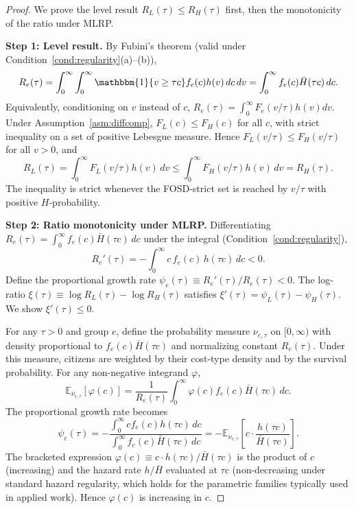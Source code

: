\begin{proof}
We prove the level result $R_L(\tau) \leq R_H(\tau)$ first, then the monotonicity of the ratio under MLRP.

\textbf{Step 1: Level result.} By Fubini's theorem (valid under Condition~\ref{cond:regularity}(a)--(b)),
\[
R_e(\tau) = \int_0^\infty \int_0^\infty \mathbbm{1}\{v \geq \tau c\} f_e(c) h(v) \, dc \, dv = \int_0^\infty f_e(c) \bar H(\tau c) \, dc.
\]
Equivalently, conditioning on $v$ instead of $c$, $R_e(\tau) = \int_0^\infty F_e(v/\tau) h(v) dv$. Under Assumption~\ref{asm:diffcomp}, $F_L(c) \leq F_H(c)$ for all $c$, with strict inequality on a set of positive Lebesgue measure. Hence $F_L(v/\tau) \leq F_H(v/\tau)$ for all $v > 0$, and
\[
R_L(\tau) = \int_0^\infty F_L(v/\tau) h(v) \, dv \leq \int_0^\infty F_H(v/\tau) h(v) \, dv = R_H(\tau).
\]
The inequality is strict whenever the FOSD-strict set is reached by $v/\tau$ with positive $H$-probability.

\textbf{Step 2: Ratio monotonicity under MLRP.} Differentiating $R_e(\tau) = \int_0^\infty f_e(c) \bar H(\tau c) \, dc$ under the integral (Condition~\ref{cond:regularity}),
\begin{equation}
R_e'(\tau) = -\int_0^\infty c \, f_e(c) \, h(\tau c) \, dc < 0.
\label{eq:Re_deriv}
\end{equation}
Define the proportional growth rate $\psi_e(\tau) \equiv R_e'(\tau)/R_e(\tau) < 0$. The log-ratio $\xi(\tau) \equiv \log R_L(\tau) - \log R_H(\tau)$ satisfies $\xi'(\tau) = \psi_L(\tau) - \psi_H(\tau)$. We show $\xi'(\tau) \leq 0$.

For any $\tau > 0$ and group $e$, define the probability measure $\nu_{e,\tau}$ on $[0, \infty)$ with density proportional to $f_e(c) \bar H(\tau c)$ and normalizing constant $R_e(\tau)$. Under this measure, citizens are weighted by their cost-type density and by the survival probability. For any non-negative integrand $\varphi$,
\[
\mathbb{E}_{\nu_{e,\tau}}[\varphi(c)] = \frac{1}{R_e(\tau)} \int_0^\infty \varphi(c) f_e(c) \bar H(\tau c) \, dc.
\]
The proportional growth rate becomes
\[
\psi_e(\tau) = -\frac{\int_0^\infty c f_e(c) h(\tau c) \, dc}{\int_0^\infty f_e(c) \bar H(\tau c) \, dc} = -\mathbb{E}_{\nu_{e,\tau}}\!\left[ c \cdot \frac{h(\tau c)}{\bar H(\tau c)} \right].
\]
The bracketed expression $\varphi(c) \equiv c \cdot h(\tau c) / \bar H(\tau c)$ is the product of $c$ (increasing) and the hazard rate $h/\bar H$ evaluated at $\tau c$ (non-decreasing under standard hazard regularity, which holds for the parametric families typically used in applied work). Hence $\varphi(c)$ is increasing in $c$.


\end{proof}
